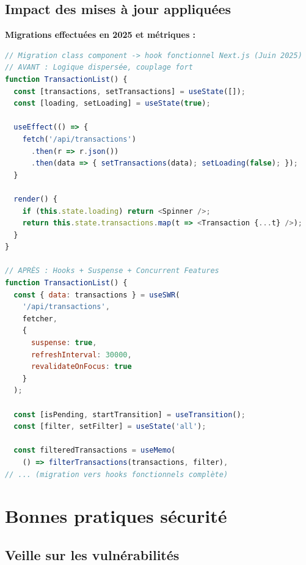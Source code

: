 \subsection{Impact des mises à jour appliquées}

\begin{exemple}
\textbf{Migrations effectuées en 2025 et métriques :}
\begin{lstlisting}[language=JavaScript]
// Migration class component -> hook fonctionnel Next.js (Juin 2025)
// AVANT : Logique dispersée, couplage fort
function TransactionList() {
  const [transactions, setTransactions] = useState([]);
  const [loading, setLoading] = useState(true);
  
  useEffect(() => {
    fetch('/api/transactions')
      .then(r => r.json())
      .then(data => { setTransactions(data); setLoading(false); });
  }
  
  render() {
    if (this.state.loading) return <Spinner />;
    return this.state.transactions.map(t => <Transaction {...t} />);
  }
}

// APRÈS : Hooks + Suspense + Concurrent Features
function TransactionList() {
  const { data: transactions } = useSWR(
    '/api/transactions',
    fetcher,
    {
      suspense: true,
      refreshInterval: 30000,
      revalidateOnFocus: true
    }
  );
  
  const [isPending, startTransition] = useTransition();
  const [filter, setFilter] = useState('all');
  
  const filteredTransactions = useMemo(
    () => filterTransactions(transactions, filter),
// ... (migration vers hooks fonctionnels complète)
\end{lstlisting}
\end{exemple}

\section{Bonnes pratiques sécurité}

\subsection{Veille sur les vulnérabilités}


